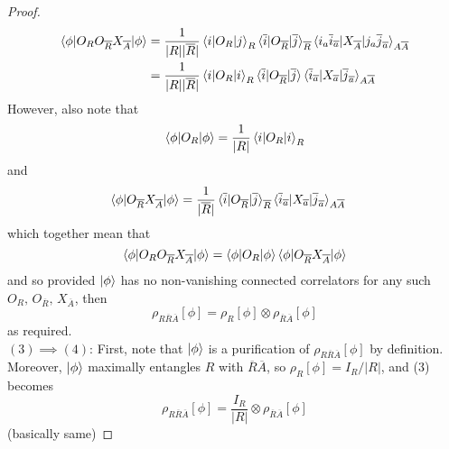 \documentclass[12pt,a4paper]{article}
\numberwithin{equation}{section}
\newcommand{\ol}[1]{\overline{#1}}
\theoremstyle{definition}
\theoremstyle{theorem}
\theoremstyle{example}
\begin{document}
\begin{itemize}
\begin{proof}
			\begin{equation}
				\begin{aligned}
					\braket{\phi|O_{R}O_{\overline{R}}X_{\overline{A}}|\phi}&=\frac{1}{|R||\overline{R}|}\braket{i|O_{R}|j}_{R}\braket{\overline{i}|O_{\overline{R}}|\overline{j}}_{\overline{R}}\braket{i_{a}\overline{i}_{\overline{a}}|X_{\overline{A}}|j_{a}\overline{j}_{\overline{a}}}_{A\overline{A}}\\
					&=\frac{1}{|R||\overline{R}|}\braket{i|O_{R}|i}_{R}\braket{\overline{i}|O_{\overline{R}}|\overline{j}}\braket{\overline{i}_{\overline{a}}|X_{\overline{a}}|\overline{j}_{\overline{a}}}_{A\overline{A}}
				\end{aligned}
			\end{equation}
			However, also note that
			\begin{equation}
				\braket{\phi|O_{R}|\phi}=\frac{1}{|R|}\braket{i|O_{R}|i}_{R}
			\end{equation}
			and
			\begin{equation}
				\begin{aligned}
					\braket{\phi|O_{\overline{R}}X_{\overline{A}}|\phi}&=\frac{1}{|\overline{R}|}\braket{\overline{i}|O_{\overline{R}}|\overline{j}}_{\overline{R}}\braket{\overline{i}_{\overline{a}}|X_{\overline{a}}|\overline{j}_{\overline{a}}}_{A\overline{A}}
				\end{aligned}
			\end{equation}
			which together mean that
			\begin{equation}
				\braket{\phi|O_{R}O_{\overline{R}}X_{\overline{A}}|\phi}=\braket{\phi|O_{R}|\phi}\braket{\phi|O_{\overline{R}}X_{\overline{A}}|\phi}
			\end{equation}
			and so provided $\ket{\phi}$ has no non-vanishing connected correlators for any such $O_{R},\,O_{\overline{R}},\,X_{\overline{A}}$, then 
			\begin{equation}
				\rho_{R\overline{R}\overline{A}}[\phi]=\rho_{R}[\phi]\otimes\rho_{\overline{R}\overline{A}}[\phi]
			\end{equation}
			as required.\\
			$(3)\implies (4)$: First, note that $\ket{\phi}$ is a purification of $\rho_{R\overline{R}\overline{A}}[\phi]$ by definition. Moreover, $\ket{\phi}$ maximally entangles $R$ with $\overline{R}\overline{A}$, so $\rho_{R}[\phi]=I_{R}/|R|$, and (3) becomes
			\begin{equation}
				\rho_{R\ol{R}\ol{A}}[\phi]=\frac{I_{R}}{|R|}\otimes\rho_{\ol{R}\ol{A}}[\phi]
			\end{equation}
			(basically same)
		\end{proof}
		
	\end{itemize}
\end{document}
